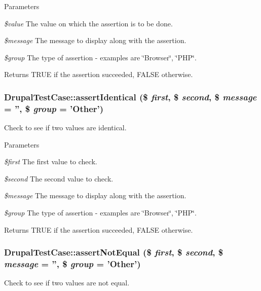 \begin{DoxyParams}{Parameters}
\item[{\em \$value}]The value on which the assertion is to be done. \item[{\em \$message}]The message to display along with the assertion. \item[{\em \$group}]The type of assertion -\/ examples are \char`\"{}Browser\char`\"{}, \char`\"{}PHP\char`\"{}. \end{DoxyParams}
\begin{DoxyReturn}{Returns}
TRUE if the assertion succeeded, FALSE otherwise. 
\end{DoxyReturn}
\hypertarget{classDrupalTestCase_afe08222abaa77bc367b110804c374298}{
\subsubsection[{assertIdentical}]{\setlength{\rightskip}{0pt plus 5cm}DrupalTestCase::assertIdentical (\$ {\em first}, \/  \$ {\em second}, \/  \$ {\em message} = {\ttfamily ''}, \/  \$ {\em group} = {\ttfamily 'Other'})}}
\label{classDrupalTestCase_afe08222abaa77bc367b110804c374298}
Check to see if two values are identical.


\begin{DoxyParams}{Parameters}
\item[{\em \$first}]The first value to check. \item[{\em \$second}]The second value to check. \item[{\em \$message}]The message to display along with the assertion. \item[{\em \$group}]The type of assertion -\/ examples are \char`\"{}Browser\char`\"{}, \char`\"{}PHP\char`\"{}. \end{DoxyParams}
\begin{DoxyReturn}{Returns}
TRUE if the assertion succeeded, FALSE otherwise. 
\end{DoxyReturn}
\hypertarget{classDrupalTestCase_a76593bb498385ecbbfb9ea3721b1da83}{
\subsubsection[{assertNotEqual}]{\setlength{\rightskip}{0pt plus 5cm}DrupalTestCase::assertNotEqual (\$ {\em first}, \/  \$ {\em second}, \/  \$ {\em message} = {\ttfamily ''}, \/  \$ {\em group} = {\ttfamily 'Other'})}}
\label{classDrupalTestCase_a76593bb498385ecbbfb9ea3721b1da83}
Check to see if two values are not equal.


